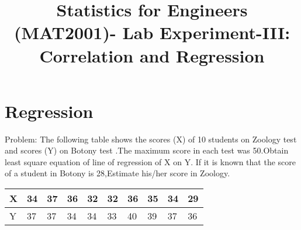 \documentclass{article}\usepackage[]{graphicx}\usepackage[]{xcolor}
\date{}
\title{Statistics for Engineers (MAT2001)- Lab  Experiment-III:  Correlation and Regression}
\begin{document}
\maketitle

\section{Regression}
Problem: \newline
The following table shows the scores (X) of 10 students on Zoology test and scores (Y) on Botony test .The maximum score in each test was 50.Obtain least square equation of line of regression of X on Y. If it is known that the score of a student in Botony is 28,Estimate his/her score in Zoology.


\begin{table}[!ht]
    \centering
    \begin{tabular}{|l|l|l|l|l|l|l|l|l|l|}
    \hline
        X & 34 & 37 & 36 & 32 & 32 & 36 & 35 & 34 & 29 \\ \hline
        Y & 37 & 37 & 34 & 34 & 33 & 40 & 39 & 37 & 36 \\ \hline

       
       \end{tabular}
\end{table}
\end{document}

